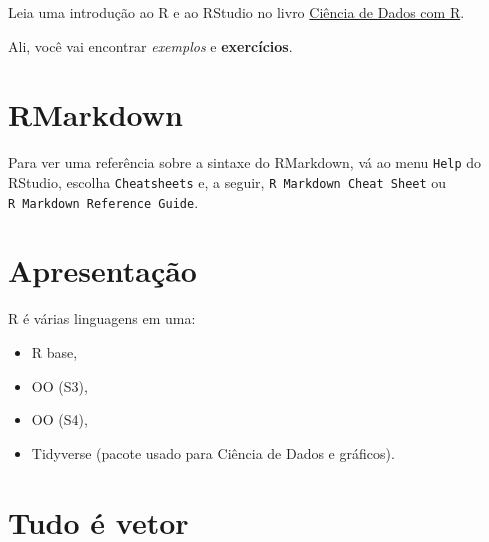 \documentclass[
  11pt]{report}
\begin{document}
Leia uma introdução ao R e ao RStudio no livro \href{https://www.ibpad.com.br/o-que-fazemos/publicacoes/introducao-ciencia-de-dados-com-r}{Ciência de Dados com R}.

Ali, você vai encontrar \emph{exemplos} e \textbf{exercícios}.

\hypertarget{rmarkdown}{%
\section{RMarkdown}\label{rmarkdown}}

Para ver uma referência sobre a sintaxe do RMarkdown, vá ao menu \texttt{Help} do RStudio, escolha \texttt{Cheatsheets} e, a seguir, \texttt{R\ Markdown\ Cheat\ Sheet} ou \texttt{R\ Markdown\ Reference\ Guide}.

\hypertarget{apresentauxe7uxe3o}{%
\section{Apresentação}\label{apresentauxe7uxe3o}}

R é várias linguagens em uma:

\begin{itemize}
\item
  R base,
\item
  OO (S3),
\item
  OO (S4),
\item
  Tidyverse (pacote usado para Ciência de Dados e gráficos).
\end{itemize}

\hypertarget{tudo-uxe9-vetor}{%
\section{Tudo é vetor}\label{tudo-uxe9-vetor}}
\end{document}
